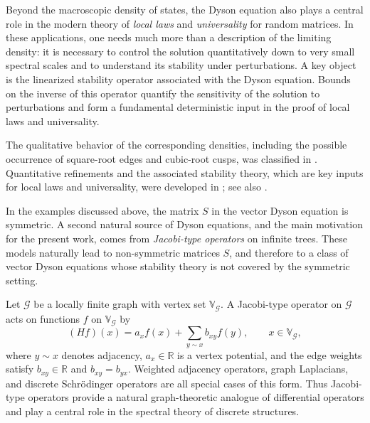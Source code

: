 \documentclass[11pt,twoside, a4paper]{article}
\numberwithin{equation}{section}
\numberwithin{figure}{section}
\theoremstyle{plain} %
\theoremstyle{definition}
\theoremstyle{remark}
\newcommand{\1} {\mspace{1 mu}}
\newcommand{\2} {\mspace{2 mu}}
\begin{document}
Beyond the macroscopic density of states, the Dyson equation also plays a
central role in the modern theory of \emph{local laws} and
\emph{universality} for random matrices. In these applications, one needs
much more than a description of the limiting density: it is necessary to
control the solution quantitatively down to very small spectral scales and
to understand its stability under perturbations. A key object is the
linearized stability operator associated with the Dyson equation. Bounds
on the inverse of this operator quantify the sensitivity of the solution
to perturbations and form a fundamental deterministic input in the proof
of local laws and universality.

The qualitative behavior of the corresponding densities, including the
possible occurrence of square-root edges and cubic-root cusps, was
classified in \cite{AEK2017singularities}. Quantitative refinements and
the associated stability theory, which are key inputs for local laws and
universality, were developed in \cite{AEK2019quadratic}; see also
\cite{AEK2016universality,AEK2016correlated,alt2017local,erdHos2020cusp,cipolloni2019cusp,alt2020correlated}.

In the examples discussed above, the matrix \(S\) in the vector Dyson
equation is symmetric. A second natural source of Dyson equations, and the
main motivation for the present work, comes from \emph{Jacobi-type
operators} on infinite trees. These models naturally lead to
non-symmetric matrices \(S\), and therefore to a class of vector Dyson
equations whose stability theory is not covered by the symmetric setting.

Let \(\mathcal G\) be a locally finite graph with vertex set \(\mathbb V_{\mathcal G}\).
A Jacobi-type operator on \(\mathcal G\) acts on functions \(f\) on
\(\mathbb V_{\mathcal G}\) by
\begin{equation}\label{eq.jacobi-operator}
    (Hf)(x)=a_x f(x)+\sum_{y\sim x} b_{xy} f(y),
    \qquad x\in \mathbb V_{\mathcal G},
\end{equation}
where \(y\sim x\) denotes adjacency, \(a_x\in \mathbb R\) is a vertex
potential, and the edge weights satisfy \(b_{xy}\in \mathbb R\) and
\(b_{xy}=b_{yx}\). Weighted adjacency operators, graph Laplacians, and
discrete Schrödinger operators are all special cases of this form. Thus
Jacobi-type operators provide a natural graph-theoretic analogue of
differential operators and play a central role in the spectral theory of
discrete structures.
\end{document}
